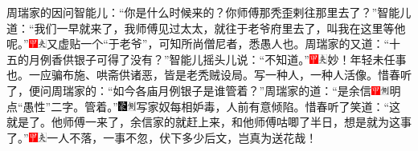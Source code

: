 周瑞家的因问智能儿：“你是什么时候来的？你师傅那秃歪剌往那里去了？”智能儿道：“我们一早就来了，我师傅见过太太，就往于老爷府里去了，叫我在这里等他呢。”{\includegraphics[width=3mm]{../Images/00002}\includegraphics[width=3mm]{../Images/00012}\footnotesize \kaishu 又虚贴一个“于老爷”，可知所尚僧尼者，悉愚人也。}周瑞家的又道：“十五的月例香供银子可得了没有？”智能儿摇头儿说：“不知道。”{\includegraphics[width=3mm]{../Images/00002}\includegraphics[width=3mm]{../Images/00012}\footnotesize \kaishu 妙！年轻未任事也。一应骗布施、哄斋供诸恶，皆是老秃贼设局。写一种人，一种人活像。}惜春听了，便问周瑞家的：“如今各庙月例银子是谁管着？”周瑞家的道：“是余信{\includegraphics[width=3mm]{../Images/00002}\includegraphics[width=3mm]{../Images/00011}\footnotesize \kaishu 明点“愚性”二字。}管着。”{\includegraphics[width=3mm]{../Images/00006}\includegraphics[width=3mm]{../Images/00011}\footnotesize \kaishu 写家奴每相妒毒，人前有意倾陷。}惜春听了笑道：“这就是了。他师傅一来了，余信家的就赶上来，和他师傅咕唧了半日，想是就为这事了。”{\includegraphics[width=3mm]{../Images/00002}\includegraphics[width=3mm]{../Images/00012}\footnotesize \kaishu 一人不落，一事不忽，伏下多少后文，岂真为送花哉！}

